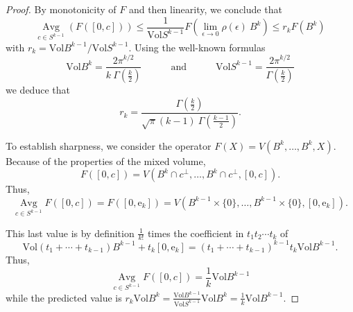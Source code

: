\documentclass{amsart}
\theoremstyle{definition}
\theoremstyle{remark}
\begin{document}
\begin{proof}
By monotonicity of $F$ and then linearity, we conclude that
\[
{\operatorname*{Avg}_{{c \in S^{k-1}}}} ( F([0,c])) \le 
\frac{1}{{\mathrm{Vol}} S^{k-1}} F( \lim_{\epsilon \rightarrow 0} \rho(\epsilon) \ B^k)
\le
r_k F(B^k) 
\]
with $r_k = {\mathrm{Vol}}{B^{k-1}} / {\mathrm{Vol}}{S^{k-1}}$. Using
the well-known formulas
\[
{\mathrm{Vol}} B^{k} = \frac{2 \pi^{k/2}}{k\  \Gamma\left( \frac{k}{2} \right)}
\hspace{3em}
\text{and}
\hspace{3em}
{\mathrm{Vol}} S^{k-1} = \frac{2 \pi^{k/2}}{\Gamma\left( \frac{k}{2} \right)}
\]
we deduce that
\[
r_k = \frac{\Gamma\left( \frac{k}{2} \right)}{\sqrt{\pi} (k-1)\  \Gamma\left( \frac{k-1}{2} \right)}
.
\]
\medskip
\par
To establish sharpness, we consider the operator $F(X) = V(B^k, \dots, B^k, X)$. Because
of the properties of the mixed volume,
\[
F( [0, c] ) = V(B^{k} \cap c^{\perp}, \dots, B^{k} \cap c^{\perp},[0,c])
.
\]
Thus,
\[
{\operatorname*{Avg}_{{c \in S^{k-1}}}} F([0,c]) = F( [0, \mathrm e_k] ) = V(B^{k-1}\times\{0\}, \dots, B^{k-1} \times\{0\},[0,\mathrm e_k])
.
\]

This last value is by definition $\frac{1}{k!}$ times the coefficient in $t_1 t_2 \cdots t_k$ of
\[
{\mathrm{Vol}}{ (t_1+\cdots+t_{k-1}) B^{k-1} + t_k[0,\mathrm e_k] } = (t_1+\cdots+t_{k-1})^{k-1}t_k {\mathrm{Vol}} B^{k-1}.
\]
Thus,
\[
{\operatorname*{Avg}_{{c \in S^{k-1}}}} F([0,c]) = \frac{1}{k} {\mathrm{Vol}} B^{k-1} 
\]
while the predicted value is
$r_k {\mathrm{Vol}} B^k = \frac{{\mathrm{Vol}}{B^{k-1}}}{{\mathrm{Vol}}{S^{k-1}}} {\mathrm{Vol}}{B^k} = \frac{1}{k}{\mathrm{Vol}} B^{k-1}$.
\end{proof}
\end{document}
